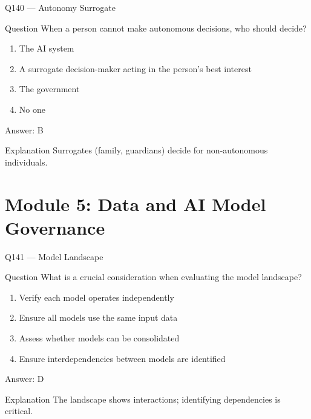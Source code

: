 \documentclass[aspectratio=169,8pt]{beamer}
\begin{document}
	\begin{frame}{Q140 --- Autonomy Surrogate}
		\begin{block}{Question}
			When a person cannot make autonomous decisions, who should decide?
		\end{block}
		\begin{enumerate}
			\item The AI system
			\item A surrogate decision-maker acting in the person's best interest
			\item The government
			\item No one
		\end{enumerate}
		\begin{exampleblock}{Answer: B}\end{exampleblock}
		\begin{block}{Explanation}
			Surrogates (family, guardians) decide for non-autonomous individuals.
		\end{block}
	\end{frame}
	
	\section{Module 5: Data and AI Model Governance}
	
	\begin{frame}{Q141 --- Model Landscape}
		\begin{block}{Question}
			What is a crucial consideration when evaluating the model landscape?
		\end{block}
		\begin{enumerate}
			\item Verify each model operates independently
			\item Ensure all models use the same input data
			\item Assess whether models can be consolidated
			\item Ensure interdependencies between models are identified
		\end{enumerate}
		\begin{exampleblock}{Answer: D}\end{exampleblock}
		\begin{block}{Explanation}
			The landscape shows interactions; identifying dependencies is critical.
		\end{block}
	\end{frame}
	
\end{document}
